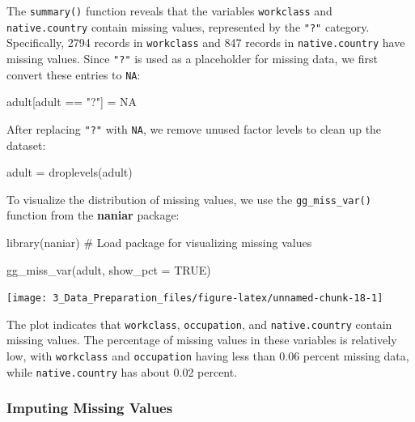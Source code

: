 \documentclass[
  11pt,
]{book}
\makeatletter
\newenvironment{Shaded}{}{}
\newcommand{\AttributeTok}[1]{#1}
\newcommand{\CommentTok}[1]{\textcolor[rgb]{0.36,0.36,0.36}{#1}}
\newcommand{\ConstantTok}[1]{#1}
\newcommand{\FunctionTok}[1]{#1}
\newcommand{\NormalTok}[1]{#1}
\newcommand{\OtherTok}[1]{\textcolor[rgb]{0.39,0.39,0.39}{#1}}
\newcommand{\SpecialCharTok}[1]{\textcolor[rgb]{0.39,0.39,0.39}{#1}}
\newcommand{\StringTok}[1]{\textcolor[rgb]{0.39,0.39,0.39}{#1}}
\newenvironment{kframe}{%
\medskip{}
\setlength{\fboxsep}{.8em}
 \def\at@end@of@kframe{}%
 \ifinner\ifhmode%
  \def\at@end@of@kframe{\end{minipage}}%
  \begin{minipage}{\columnwidth}%
 \fi\fi%
 \def\FrameCommand##1{\hskip\@totalleftmargin \hskip-\fboxsep
 \colorbox{shadecolor}{##1}\hskip-\fboxsep
     \hskip-\linewidth \hskip-\@totalleftmargin \hskip\columnwidth}%
 \MakeFramed {\advance\hsize-\width
   \@totalleftmargin\z@ \linewidth\hsize
   \@setminipage}}%
 {\par\unskip\endMakeFramed%
 \at@end@of@kframe}
\renewenvironment{Shaded}{\begin{kframe}}{\end{kframe}}
\theoremstyle{definition}
\theoremstyle{definition}
\theoremstyle{definition}
\theoremstyle{definition}
\theoremstyle{remark}
\makeatother
\begin{document}
The \texttt{summary()} function reveals that the variables \texttt{workclass} and \texttt{native.country} contain missing values, represented by the \texttt{"?"} category. Specifically, 2794 records in \texttt{workclass} and 847 records in \texttt{native.country} have missing values. Since \texttt{"?"} is used as a placeholder for missing data, we first convert these entries to \texttt{NA}:

\begin{Shaded}
\begin{Highlighting}[]
\NormalTok{adult[adult }\SpecialCharTok{==} \StringTok{"?"}\NormalTok{] }\OtherTok{=} \ConstantTok{NA}
\end{Highlighting}
\end{Shaded}

After replacing \texttt{"?"} with \texttt{NA}, we remove unused factor levels to clean up the dataset:

\begin{Shaded}
\begin{Highlighting}[]
\NormalTok{adult }\OtherTok{=} \FunctionTok{droplevels}\NormalTok{(adult)}
\end{Highlighting}
\end{Shaded}

To visualize the distribution of missing values, we use the \texttt{gg\_miss\_var()} function from the \textbf{naniar} package:

\begin{Shaded}
\begin{Highlighting}[]
\FunctionTok{library}\NormalTok{(naniar)  }\CommentTok{\# Load package for visualizing missing values}

\FunctionTok{gg\_miss\_var}\NormalTok{(adult, }\AttributeTok{show\_pct =} \ConstantTok{TRUE}\NormalTok{)}
\end{Highlighting}
\end{Shaded}

\begin{center}\texttt{[image: 3\_Data\_Preparation\_files/figure-latex/unnamed-chunk-18-1]} \end{center}

The plot indicates that \texttt{workclass}, \texttt{occupation}, and \texttt{native.country} contain missing values. The percentage of missing values in these variables is relatively low, with \texttt{workclass} and \texttt{occupation} having less than 0.06 percent missing data, while \texttt{native.country} has about 0.02 percent.

\subsubsection*{Imputing Missing Values}\label{imputing-missing-values}
\end{document}
